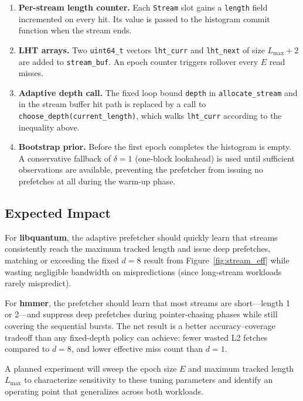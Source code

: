 \documentclass[10pt,twocolumn]{article}
\begin{document}
\begin{enumerate}
  \item \textbf{Per-stream length counter.} Each \texttt{Stream} slot
    gains a \texttt{length} field incremented on every hit. Its value
    is passed to the histogram commit function when the stream ends.
  \item \textbf{LHT arrays.} Two \texttt{uint64\_t} vectors
    \texttt{lht\_curr} and \texttt{lht\_next} of size $L_{\max}+2$ are
    added to \texttt{stream\_buf}. An epoch counter triggers rollover
    every $E$ read misses.
  \item \textbf{Adaptive depth call.} The fixed loop bound \texttt{depth}
    in \texttt{allocate\_stream} and in the stream buffer hit path is
    replaced by a call to \texttt{choose\_depth(current\_length)}, which
    walks \texttt{lht\_curr} according to the inequality above.
  \item \textbf{Bootstrap prior.} Before the first epoch completes the
    histogram is empty. A conservative fallback of $\delta=1$
    (one-block lookahead) is used until sufficient observations are
    available, preventing the prefetcher from issuing no prefetches at
    all during the warm-up phase.
\end{enumerate}

\subsection{Expected Impact}

For \textbf{libquantum}, the adaptive prefetcher should quickly learn
that streams consistently reach the maximum tracked length and issue
deep prefetches, matching or exceeding the fixed $d=8$ result from
Figure~\ref{fig:stream_eff} while wasting negligible bandwidth on
mispredictions (since long-stream workloads rarely mispredict).

For \textbf{hmmer}, the prefetcher should learn that most streams are
short---length 1 or 2---and suppress deep prefetches during
pointer-chasing phases while still covering the sequential bursts.
The net result is a better accuracy--coverage tradeoff than any
fixed-depth policy can achieve: fewer wasted L2 fetches compared to
$d=8$, and lower effective miss count than $d=1$.

A planned experiment will sweep the epoch size $E$ and maximum tracked
length $L_{\max}$ to characterize sensitivity to these tuning parameters
and identify an operating point that generalizes across both workloads.
\end{document}
